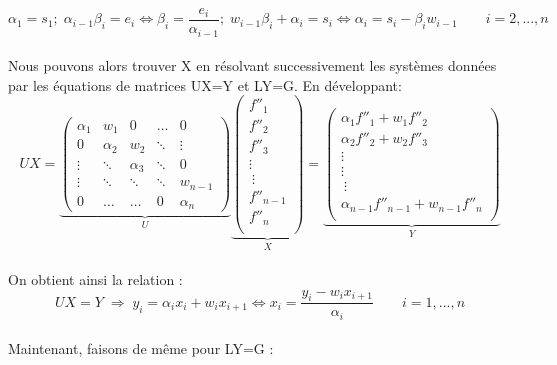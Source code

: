 \documentclass{article}
\begin{document}
\[\alpha_1=s_1; \; \alpha_{i-1}\beta_i = e_i \Leftrightarrow \beta_i=\frac{e_i}{\alpha_{i-1}}; \; w_{i-1}\beta_{i} + \alpha_i = s_i \Leftrightarrow \alpha_i=s_i-\beta_{i}w_{i-1} \qquad i=2,...,n\]
\\

\newpage
Nous pouvons alors trouver X en r\'{e}solvant successivement les syst\`emes donn\'{e}es par les \'{e}quations de matrices UX=Y et LY=G. En d\'{e}veloppant:
\\
\[UX=\underbrace{\begin{pmatrix}
\alpha_1 & w_1 & 0 & \ldots & 0 \\
0 & \alpha_2 & w_2 & \ddots & \vdots \\
\vdots & \ddots & \alpha_3 & \ddots & 0 \\
\vdots & \ddots & \ddots & \ddots & w_{n-1} \\
0 & \ldots & \ldots & 0 & \alpha_n
\end{pmatrix}
}_{U}
\underbrace{\begin{pmatrix}
f''_1 \\
f''_2 \\
f''_3\\
\vdots\\\
\vdots\\
f''_{n-1} \\
f''_n \\
\end{pmatrix}
}_{X}
=
\underbrace{\begin{pmatrix}
\alpha_1f''_1+w_1f''_2 \\
\alpha_2f''_2+w_2f''_3 \\
\vdots\\
\vdots\\\
\vdots\\
\alpha_{n-1}f''_{n-1}+w_{n-1}f''_n \\
\end{pmatrix}
}_{Y}\]
\\
On obtient ainsi la relation :
\\
\[UX=Y \; \Rightarrow \; y_i=\alpha_ix_i+w_ix_{i+1} \Leftrightarrow x_i=\frac{y_i-w_{i}x_{i+1}}{\alpha_i}  \qquad i=1,...,n\]
\\
Maintenant, faisons de m\^{e}me pour LY=G :
\end{document}
